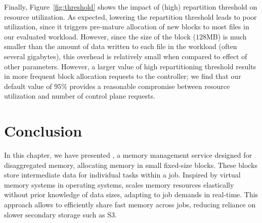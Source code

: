  Finally, Figure~\ref{fig:threshold} shows the impact of (high) repartition threshold on resource utilization. As expected, lowering the repartition threshold leads to poor utilization, since it triggers pre-mature allocation of new blocks to most files in our evaluated workload. However, since the size of the block ($128$MB) is much smaller than the amount of data written to each file in the workload (often several gigabytes), this overhead is relatively small when compared to effect of other parameters. However, a larger value of high repartitioning threshold results in more frequent block allocation requests to the controller; we find that our default value of $95\%$ provides a reasonable compromise between resource utilization and number of control plane requests.




\section{Conclusion}
\label{sec:jiffysummary}
In this chapter, we have presented \jiffy, a memory management service designed for disaggregated memory, allocating memory in small fixed-size blocks. These blocks store intermediate data for individual tasks within a job. Inspired by virtual memory systems in operating systems, \jiffy scales memory resources elastically without prior knowledge of data sizes, adapting to job demands in real-time. This approach allows \jiffy to efficiently share fast memory across jobs, reducing reliance on slower secondary storage such as S3.








